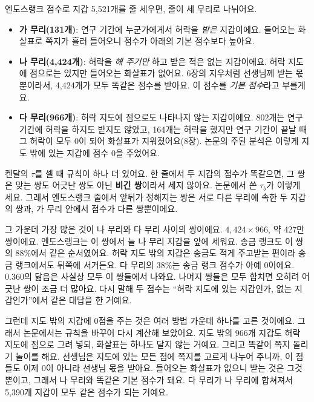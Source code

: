 \begin{deeper}[0.360을 조금 더 들여다보기]
\setlength{\parskip}{0.55em}%
엔도스랭크 점수로 지갑 5,521개를 줄 세우면, 줄이 세 무리로 나뉘어요.

\begin{itemize}
\item \textbf{가 무리(131개)}: 연구 기간에 누군가에게서 허락을 \emph{받은} 지갑이에요.
      들어오는 화살표로 쪽지가 흘러 들어오니 점수가 아래의 기본 점수보다 높아요.
\item \textbf{나 무리(4,424개)}: 허락을 \emph{해 주기만} 하고 받은 적은 없는 지갑이에요.
      허락 지도에 점으로는 있지만 들어오는 화살표가 없어요.
      6장의 지우처럼 선생님께 받는 몫뿐이라서, 4,424개가 모두 똑같은 점수를 받아요.
      이 점수를 \emph{기본 점수}라고 부를게요.
\item \textbf{다 무리(966개)}: 허락 지도에 점으로도 나타나지 않는 지갑이에요.
      802개는 연구 기간에 허락을 하지도 받지도 않았고, 164개는 허락을 했지만 연구 기간이 끝날 때 그 허락이 모두 0이 되어 화살표가 지워졌어요(8장).
      논문의 주된 분석은 이렇게 지도 밖에 있는 지갑에 점수 0을 주었어요.
\end{itemize}

켄달의 $\tau$를 셀 때 규칙이 하나 더 있어요.
한 줄에서 두 지갑의 점수가 똑같으면, 그 쌍은 맞는 쌍도 어긋난 쌍도 아닌 \textbf{비긴 쌍}이라서 세지 않아요.
논문에서 쓴 $\tau_b$가 이렇게 세요.
그래서 엔도스랭크 줄에서 앞뒤가 정해지는 쌍은 서로 다른 무리에 속한 두 지갑의 쌍과, 가 무리 안에서 점수가 다른 쌍뿐이에요.

그 가운데 가장 많은 것이 나 무리와 다 무리 사이의 쌍이에요.
$4{,}424\times966$, 약 427만 쌍이에요.
엔도스랭크는 이 쌍에서 늘 나 무리 지갑을 앞에 세워요.
송금 랭크도 이 쌍의 88\%에서 같은 순서였어요.
허락 지도 밖의 지갑은 송금도 적게 주고받는 편이라 송금 랭크에서도 뒤쪽에 서거든요.
다 무리의 38\%는 송금 랭크 점수가 아예 0이에요.
0.360의 닮음은 사실상 모두 이 쌍들에서 나와요.
나머지 쌍들은 모두 합치면 오히려 어긋난 쌍이 조금 더 많아요.
다시 말해 두 점수는 “허락 지도에 있는 지갑인가, 없는 지갑인가”에서 같은 대답을 한 거예요.

그런데 지도 밖의 지갑에 0점을 주는 것은 여러 방법 가운데 하나를 고른 것이에요.
그래서 논문에서는 규칙을 바꾸어 다시 계산해 보았어요.
지도 밖의 966개 지갑도 허락 지도에 점으로 그려 넣되, 화살표는 하나도 달지 않는 거예요.
그리고 똑같이 쪽지 돌리기 놀이를 해요.
선생님은 지도에 있는 모든 점에 쪽지를 고르게 나누어 주니까, 이 점들도 이제 0이 아니라 선생님 몫을 받아요.
들어오는 화살표가 없으니 받는 것은 그것뿐이고, 그래서 나 무리와 똑같은 기본 점수가 돼요.
다 무리가 나 무리에 합쳐져서 5,390개 지갑이 모두 같은 점수가 되는 거예요.


\end{deeper}
